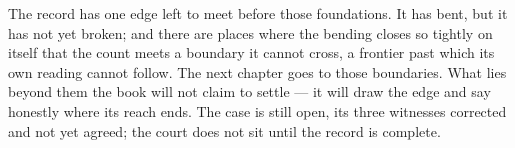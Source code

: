 The record has one edge left to meet before those foundations. It has bent, but it has not yet broken; and there
are places where the bending closes so tightly on itself that the count meets a boundary it cannot cross, a
frontier past which its own reading cannot follow. The next chapter goes to those boundaries. What lies beyond
them the book will not claim to settle --- it will draw the edge and say honestly where its reach ends. The case
is still open, its three witnesses corrected and not yet agreed; the court does not sit until the record is
complete.
